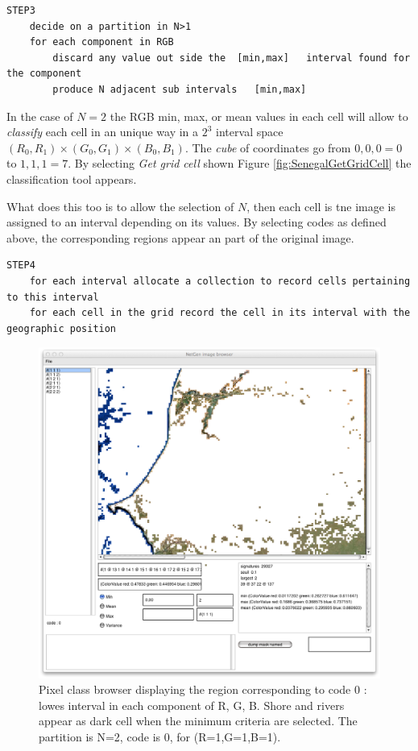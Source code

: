 \begin{lstlisting}  
STEP3
	decide on a partition in N>1
	for each component in RGB
		discard any value out side the  [min,max]   interval found for the component
		produce N adjacent sub intervals   [min,max]  
\end{lstlisting}

In the case of $N=2$ the RGB min, max, or mean values in each cell will allow to {\sl classify}
each cell in an unique way in a $2^3$ interval space $(R_0,R_1) \times (G_0,G_1) \times (B_0,B_1) $.
The {\sl cube} of coordinates go from $0,0,0= 0$ to $1,1,1= 7$.
By selecting {\sl Get grid cell} shown Figure \ref{fig:SenegalGetGridCell} the classification tool appears.

What does this too is to allow the selection of $N$, then each cell is tne image is assigned to an interval
depending on its values. By selecting codes as defined above, the corresponding regions appear
an part of the original image. 


\begin{lstlisting}  
STEP4
	for each interval allocate a collection to record cells pertaining to this interval
	for each cell in the grid record the cell in its interval with the geographic position
\end{lstlisting}


\begin{figure}[hbtp]
\begin{center} 
\includegraphics[width=12cm]{Senegal5x5code0.png}
\caption{Pixel class  browser displaying the region corresponding to code 0 : lowes interval in each component of R, G, B.
Shore and rivers appear as dark cell when the minimum criteria are selected. The partition is N=2, code is 0, for (R=1,G=1,B=1).}
\label{fig:Senegal5x5code0}
\end{center}
\end{figure}

